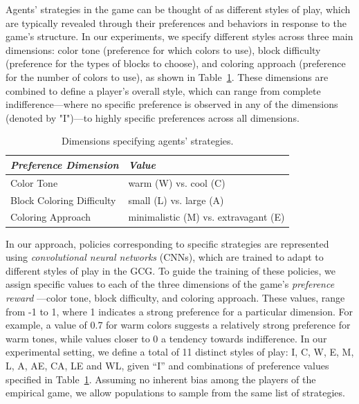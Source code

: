         \noindent
        Agents' strategies in the game can be thought of as different styles of play, which are typically revealed through their preferences and behaviors in response to the game’s structure. In our experiments, we specify different styles across three main dimensions: color tone (preference for which colors to use), block difficulty (preference for the types of blocks to choose), and coloring approach (preference for the number of colors to use), as shown in Table~\ref{tab:preferences}. These dimensions are combined to define a player's overall style, which can range from complete indifference—where no specific preference is observed in any of the dimensions (denoted by "I")—to highly specific preferences across all dimensions.
        \begin{table}[H]
            \centering
            \caption{Dimensions specifying agents' strategies.}
            \label{tab:preferences}
            \vspace{0.5em}
            \begin{tabular}{ll}
                \toprule
                \textit{Preference Dimension} & \textit{Value} \\ 
                \midrule
                Color Tone & warm (W) vs. cool (C) \\ 
                Block Coloring Difficulty & small (L) vs. large (A) \\ 
                Coloring Approach & minimalistic (M) vs. extravagant (E) \\ 
                \bottomrule
            \end{tabular}
        \end{table}

        \noindent
        In our approach, policies corresponding to specific strategies are represented using \emph{convolutional neural networks} (CNNs), which are trained to adapt to different styles of play in the GCG. To guide the training of these policies, we assign specific values to each of the three dimensions of the game's \emph{preference reward} —color tone, block difficulty, and coloring approach. These values, range from -1 to 1, where 1 indicates a strong preference for a particular dimension. For example, a value of 0.7 for warm colors suggests a relatively strong preference for warm tones, while values closer to 0 a tendency towards indifference. In our experimental setting, we define a total of 11 distinct styles of play: I, C, W, E, M, L, A, AE, CA, LE and WL, given ``I'' and combinations of preference values specified in Table~\ref{tab:preferences}. Assuming no inherent bias among the players of the empirical game, we allow populations to sample from the same list of strategies.

